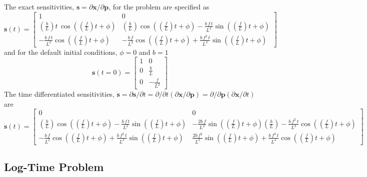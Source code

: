 The exact sensitivities, $\mathbf{s}=\partial\mathbf{x}/\partial\mathbf{p}$,
for the problem are specified as
\[
\mathbf{s}(t)=\left[\begin{array}{cc}
1 & 0\\
\left(\frac{b}{L}\right)t\,\cos\left(\left(\frac{f}{L}\right)t+\phi\right) & \left(\frac{b}{L}\right)\cos\left(\left(\frac{f}{L}\right)t+\phi\right)-\frac{b\, f\, t}{L^{2}}\sin\left(\left(\frac{f}{L}\right)t+\phi\right)\\
-\frac{b\, f\, t}{L^{2}}\cos\left(\left(\frac{f}{L}\right)t+\phi\right) & -\frac{b\, f}{L^{2}}\cos\left(\left(\frac{f}{L}\right)t+\phi\right)+\frac{b\, f^{2}\, t}{L^{3}}\sin\left(\left(\frac{f}{L}\right)t+\phi\right)
\end{array}\right]
\]
and for the default initial conditions, $\phi=0$ and $b=1$
\[
\mathbf{s}(t=0)=\left[\begin{array}{cc}
1 & 0\\
0 & \frac{b}{L}\\
0 & -\frac{f}{L^{2}}
\end{array}\right]
\]
The time differentiated sensitivities, $\dot{\mathbf{s}}=\partial\mathbf{s}/\partial t=\partial/\partial t(\partial\mathbf{x}/\partial\mathbf{p})=\partial/\partial\mathbf{p}(\partial\mathbf{x}/\partial t)$
are
\[
\dot{\mathbf{s}}(t)=\left[\begin{array}{cc}
0 & 0\\
\left(\frac{b}{L}\right)\cos\left(\left(\frac{f}{L}\right)t+\phi\right)-\frac{b\, f\, t}{L^{2}}\sin\left(\left(\frac{f}{L}\right)t+\phi\right) & -\frac{2b\, f}{L^{2}}\sin\left(\left(\frac{f}{L}\right)t+\phi\right)\left(\frac{b}{L}\right)-\frac{b\, f^{2}\, t}{L^{3}}\cos\left(\left(\frac{f}{L}\right)t+\phi\right)\\
-\frac{b\, f}{L^{2}}\cos\left(\left(\frac{f}{L}\right)t+\phi\right)+\frac{b\, f^{2}\, t}{L^{3}}\sin\left(\left(\frac{f}{L}\right)t+\phi\right) & \frac{2b\, f^{2}}{L^{3}}\sin\left(\left(\frac{f}{L}\right)t+\phi\right)+\frac{b\, f^{3}\, t}{L^{4}}\cos\left(\left(\frac{f}{L}\right)t+\phi\right)
\end{array}\right]
\]



\subsection{Log-Time Problem\label{rythmos:sec:Log-Time-Problem}}

